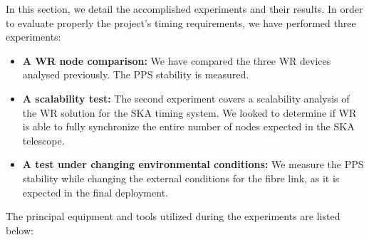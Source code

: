 
In this section, we detail the accomplished experiments and their results. In 
order to evaluate properly the project's timing requirements, we have performed 
three experiments:

\begin{itemize}
	\item \textbf{A WR node comparison:} We have compared the three WR devices 
	analysed previously. The PPS stability is measured.
	\item \textbf{A scalability test:} The second experiment covers a 
	scalability analysis of the WR solution for the SKA timing system. We 
	looked to determine if WR is able to fully synchronize the entire number of 
	nodes expected in the SKA telescope.
	\item \textbf{A test under changing environmental conditions:} We measure 
	the PPS stability while changing the external conditions for the fibre 
	link, as it is expected in the final deployment.
\end{itemize}

The principal equipment and tools utilized during the experiments are listed 
below:

